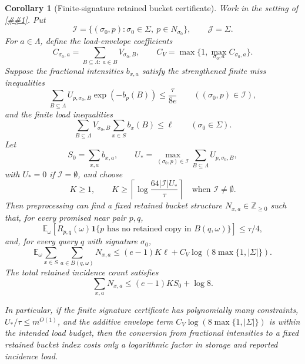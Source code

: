\documentclass[10pt]{article}
\newcommand{\cref}[1]{\ref{##1}}
\newtheorem{corollary}[theorem]{Corollary}
\theoremstyle{definition}
\newcommand{\E}{\mathbb{E}}
\begin{document}
\begin{corollary}[Finite-signature retained bucket certificate]
   \label{cor:finite-signature-retained-buckets}
   Work in the setting of \cref{lem:finite-signature-rate-coverage}.  Put
   \[
      \mathcal I=
      \{(\sigma_0,p):\sigma_0\in\Sigma,\ p\in N_{\sigma_0}\},
      \qquad
      \mathcal J=\Sigma .
   \]
   For \(a\in\Lambda\), define the load-envelope coefficients
   \[
      C_{\sigma_0,a}
      =
      \sum_{B\subseteq\Lambda:\ a\in B}V_{\sigma_0,B},
      \qquad
      C_V=\max\{1,\max_{\sigma_0,a}C_{\sigma_0,a}\}.
      \tag{FRC0}
   \]
   Suppose the fractional intensities \(b_{x,a}\) satisfy the strengthened
   finite miss inequalities
   \[
      \sum_{B\subseteq\Lambda}
      U_{p,\sigma_0,B}\exp(-b_p(B))
      \le \frac{\tau}{8e}
      \qquad((\sigma_0,p)\in\mathcal I),
      \tag{FRC1}
   \]
   and the finite load inequalities
   \[
      \sum_{B\subseteq\Lambda}
      V_{\sigma_0,B}\sum_{x\in S}b_x(B)
      \le \ell
      \qquad(\sigma_0\in\Sigma).
      \tag{FRC2}
   \]
   Let
   \[
      S_0=\sum_{x,a}b_{x,a},
      \qquad
      U_*=\max_{(\sigma_0,p)\in\mathcal I}
      \sum_{B\subseteq\Lambda}U_{p,\sigma_0,B},
   \]
   with \(U_*=0\) if \(\mathcal I=\emptyset\), and choose
   \[
      K\ge1,\qquad
      K\ge
      \left\lceil
      \log\frac{64|\mathcal I|U_*}{\tau}
      \right\rceil
      \quad\text{when }\mathcal I\ne\emptyset .
      \tag{FRC3}
   \]
   Then preprocessing can find a fixed retained bucket structure
   \(N_{x,a}\in\mathbb Z_{\ge0}\) such that, for every promised near pair
   \(p,q\),
   \[
      \E_\omega\!\left[
         R_{p,q}(\omega)
         \mathbf 1\{p\text{ has no retained copy in }B(q,\omega)\}
      \right]
      \le \tau/4 ,
      \tag{FRC4}
   \]
   and, for every query \(q\) with signature \(\sigma_0\),
   \[
      \E_\omega
      \sum_{x\in S}\sum_{a\in B(q,\omega)}N_{x,a}
      \le
      (e-1)K\ell+C_V\log(8\max\{1,|\Sigma|\}).
      \tag{FRC5}
   \]
   The total retained incidence count satisfies
   \[
      \sum_{x,a}N_{x,a}\le(e-1)KS_0+\log8 .
      \tag{FRC6}
   \]

   In particular, if the finite signature certificate has polynomially many
   constraints, \(U_*/\tau\le m^{O(1)}\), and the additive envelope term
   \(C_V\log(8\max\{1,|\Sigma|\})\) is within the intended load budget, then
   the conversion from fractional intensities to a fixed retained bucket index
   costs only a logarithmic factor in storage and reported incidence load.
\end{corollary}
\end{document}
